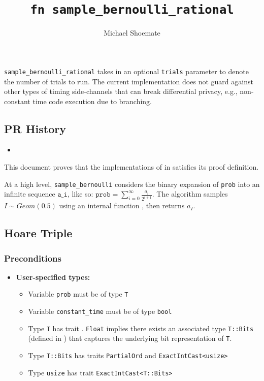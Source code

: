 \documentclass{article}
\title{\texttt{fn sample\_bernoulli\_rational}}
\author{Michael Shoemate}
\begin{document}
\maketitle

\contrib
\begin{tcolorbox}
    \begin{warning}
     \texttt{sample\_bernoulli\_rational} takes in an optional \texttt{trials} parameter to denote the number of trials to run. The current implementation does not guard against other types of timing side-channels that can break differential privacy, e.g., non-constant time code execution due to branching.
    \end{warning}
\end{tcolorbox}

\subsection*{PR History}
\begin{itemize}
    \item {}
\end{itemize}

This document proves that the implementations of  in  
satisfies its proof definition.

At a high level, \texttt{sample\_bernoulli} considers the binary expansion of \texttt{prob} into an infinite sequence $\texttt{a\_i}$, 
like so: $\texttt{prob} = \sum_{i = 0}^{\infty} \frac{a_i}{2^{i + 1}}$. 
The algorithm samples $I \sim Geom(0.5)$ using an internal function , then returns $a_I$. 

\subsection{Hoare Triple}
\subsubsection*{Preconditions}
\begin{itemize}
    \item \textbf{User-specified types:}
    \begin{itemize}
        \item Variable \texttt{prob} must be of type \texttt{T}
        \item Variable \texttt{constant\_time} must be of type \texttt{bool}
        \item Type \texttt{T} has trait . 
            \texttt{Float} implies there exists an associated type \texttt{T::Bits} (defined in ) that captures the underlying bit representation of \texttt{T}.
        \item Type \texttt{T::Bits} has traits \texttt{PartialOrd} and \texttt{ExactIntCast<usize>}
        \item Type \texttt{usize} has trait \texttt{ExactIntCast<T::Bits>}
    \end{itemize}
\end{itemize}
\end{document}
